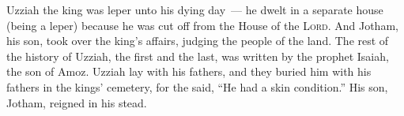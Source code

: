 \begin{inparaenum}
     Uzziah the king was leper unto his dying day~--- he dwelt in a separate house (being a leper) because he was cut off from the House of the \textsc{Lord}. And Jotham, his son, took over the king's affairs, judging the people of the land.%
     The rest of the history of Uzziah, the first and the last, was written by the prophet Isaiah, the son of Amoz.%
     Uzziah lay with his fathers, and they buried him with his fathers in the kings' cemetery, for the said, ``He had a skin condition.'' His son, Jotham, reigned in his stead.%
\end{inparaenum}
